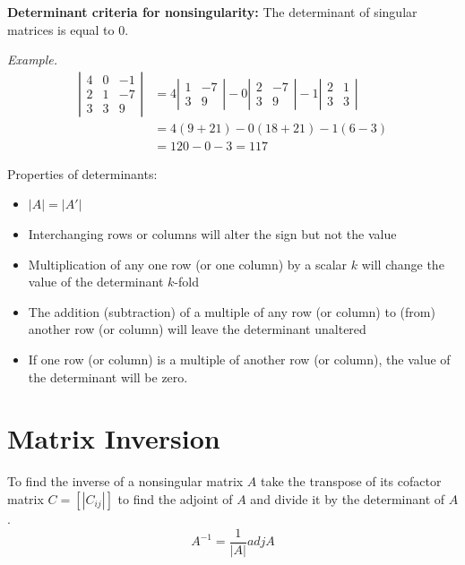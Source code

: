 \documentclass{./../../latex/handout}
\begin{document}
\textbf{Determinant criteria for nonsingularity:} {The determinant of singular matrices is equal to 0. }\ 

\textit{Example.}
\[
\begin{aligned}
\left|\begin{array}{ccc}
4 & 0 & -1 \\
2 & 1 & -7 \\
3 & 3 & 9
\end{array}\right| &=4\left|\begin{array}{rr}
1 & -7 \\
3 & 9
\end{array}\right|-0\left|\begin{array}{cc}
2 & -7 \\
3 & 9
\end{array}\right|-1\left|\begin{array}{ll}
2 & 1 \\
3 & 3
\end{array}\right| \\
&=4(9+21)-0(18+21)-1(6-3) \\
&=120-0-3=117
\end{aligned}
\]

Properties of determinants: 
 \begin{itemize}
\item[1.] $ |A| = |A'|$ 
\item[2.] Interchanging rows or columns will alter the sign but not the value
\item[3.] Multiplication of any one row (or one column) by a scalar $k$ will change the value of the determinant $k$-fold
\item[4.] The addition (subtraction) of a multiple of any row (or column) to (from) another row (or column) will leave the determinant unaltered
\item[5.] If one row (or column) is a multiple of another row (or column), the value of the determinant will be zero. 
\end{itemize}




\section{Matrix Inversion}

To find the inverse of a nonsingular matrix $A$ take the transpose of its cofactor matrix $C = [|C_{ij}|]$ to find the adjoint of $A$ and divide it by the determinant of $A$. 
\[ A^{-1} = \frac{1}{|A|} adj A\] 
\end{document}
